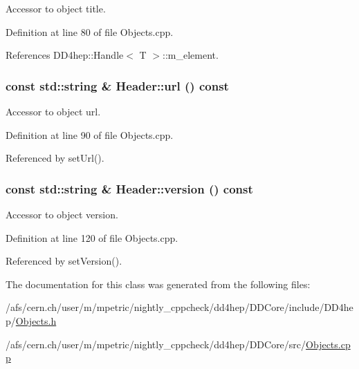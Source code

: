 Accessor to object title. 

Definition at line 80 of file Objects.cpp.

References DD4hep::Handle$<$ T $>$::m\_\-element.\hypertarget{class_d_d4hep_1_1_geometry_1_1_header_a83256db8c7c5257820e73828ecc41d00}{
\subsubsection[{url}]{\setlength{\rightskip}{0pt plus 5cm}const std::string \& Header::url () const}}
\label{class_d_d4hep_1_1_geometry_1_1_header_a83256db8c7c5257820e73828ecc41d00}


Accessor to object url. 

Definition at line 90 of file Objects.cpp.

Referenced by setUrl().\hypertarget{class_d_d4hep_1_1_geometry_1_1_header_ac514910d5d41e73099a5ee7b9bff0dc1}{
\subsubsection[{version}]{\setlength{\rightskip}{0pt plus 5cm}const std::string \& Header::version () const}}
\label{class_d_d4hep_1_1_geometry_1_1_header_ac514910d5d41e73099a5ee7b9bff0dc1}


Accessor to object version. 

Definition at line 120 of file Objects.cpp.

Referenced by setVersion().

The documentation for this class was generated from the following files:\begin{DoxyCompactItemize}
\item 
/afs/cern.ch/user/m/mpetric/nightly\_\-cppcheck/dd4hep/DDCore/include/DD4hep/\hyperlink{_objects_8h}{Objects.h}\item 
/afs/cern.ch/user/m/mpetric/nightly\_\-cppcheck/dd4hep/DDCore/src/\hyperlink{_objects_8cpp}{Objects.cpp}\end{DoxyCompactItemize}
